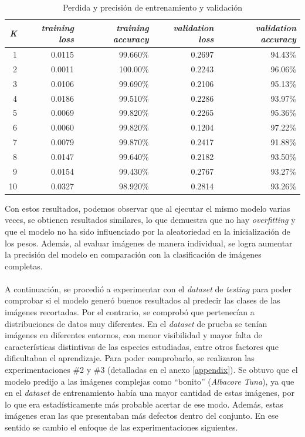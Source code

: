 \begin{table}[h!]
\footnotesize
\centering
\begin{tabular}{|r|r|r|r|r|}
\hline
\textit{K} & \textit{training loss} & \textit{training accuracy} & \textit{validation loss} & \textit{validation accuracy} \\ \hline
1    & 0.0115      & 99.660\%    & 0.2697    & 94.43\%  \\ \hline
2    & 0.0011      & 100.00\%   & 0.2243    & 96.06\%  \\ \hline
3    & 0.0106      & 99.690\%    & 0.2106    & 95.13\%  \\ \hline
4    & 0.0186      & 99.510\%    & 0.2286    & 93.97\%  \\ \hline
5    & 0.0069      & 99.820\%    & 0.2265    & 95.36\%  \\ \hline
6    & 0.0060      & 99.820\%    & 0.1204    & 97.22\%  \\ \hline
7    & 0.0079      & 99.870\%    & 0.2417    & 91.88\%  \\ \hline
8    & 0.0147      & 99.640\%    & 0.2182    & 93.50\%  \\ \hline
9    & 0.0154      & 99.430\%    & 0.2767    & 93.27\%  \\ \hline
10   & 0.0327      & 98.920\%    & 0.2814    & 93.26\%  \\ \hline
\end{tabular}
\caption{Perdida y precisión de entrenamiento y validación}
\label{table:KFolds1}
\end{table}
Con estos resultados, podemos observar que al ejecutar el mismo modelo varias veces, se obtienen resultados similares, lo que demuestra que no hay \textit{overfitting} y que el modelo no ha sido influenciado por la aleatoriedad en la inicialización de los pesos. Además, al evaluar imágenes de manera individual, se logra aumentar la precisión del modelo en comparación con la clasificación de imágenes completas.
\\\\
A continuación, se procedió a experimentar con el \textit{dataset} de \textit{testing} para poder comprobar si el modelo generó buenos resultados al predecir las clases de las imágenes recortadas. Por el contrario, se comprobó que pertenecían a distribuciones de datos muy diferentes. En el \textit{dataset} de prueba se tenían imágenes en diferentes entornos, con menor visibilidad y mayor falta de características distintivas de las especies estudiadas, entre otros factores que dificultaban el aprendizaje. Para poder comprobarlo, se realizaron las experimentaciones \#2 y \#3 (detalladas en el anexo \ref{appendix}). Se obtuvo que el modelo predijo a las imágenes complejas como ``bonito'' (\textit{Albacore Tuna}), ya que en el \textit{dataset} de entrenamiento había una mayor cantidad de estas imágenes, por lo que era estadísticamente más probable acertar de ese modo. Además, estas imágenes eran las que presentaban más defectos dentro del conjunto. En ese sentido se cambio el enfoque de las experimentaciones siguientes.
\\\\
